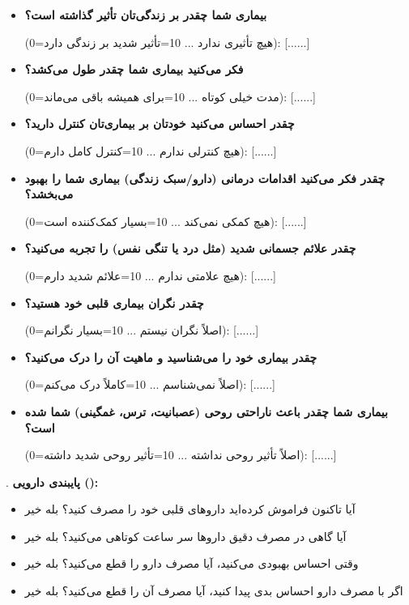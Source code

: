 \begin{itemize}
  \item \textbf{بیماری شما چقدر بر زندگی‌تان تأثیر گذاشته است؟}

  (0=هیچ تأثیری ندارد ... 10=تأثیر شدید بر زندگی دارد): [......]

  \item \textbf{فکر می‌کنید بیماری شما چقدر طول می‌کشد؟}

  (0=مدت خیلی کوتاه ... 10=برای همیشه باقی می‌ماند): [......]

  \item \textbf{چقدر احساس می‌کنید خودتان بر بیماری‌تان کنترل دارید؟}

  (0=هیچ کنترلی ندارم ... 10=کنترل کامل دارم): [......]

  \item \textbf{چقدر فکر می‌کنید اقدامات درمانی (دارو/سبک زندگی) بیماری شما را بهبود می‌بخشد؟}

  (0=هیچ کمکی نمی‌کند ... 10=بسیار کمک‌کننده است): [......]

  \item \textbf{چقدر علائم جسمانی شدید (مثل درد یا تنگی نفس) را تجربه می‌کنید؟}

  (0=هیچ علامتی ندارم ... 10=علائم شدید دارم): [......]

  \item \textbf{چقدر نگران بیماری قلبی خود هستید؟}

  (0=اصلاً نگران نیستم ... 10=بسیار نگرانم): [......]

  \item \textbf{چقدر بیماری خود را می‌شناسید و ماهیت آن را درک می‌کنید؟}

  (0=اصلاً نمی‌شناسم ... 10=کاملاً درک می‌کنم): [......]

  \item \textbf{بیماری شما چقدر باعث ناراحتی روحی (عصبانیت، ترس، غمگینی) شما شده است؟}

  (0=اصلاً تأثیر روحی نداشته ... 10=تأثیر روحی شدید داشته): [......]
\end{itemize}

. \textbf{پایبندی دارویی ():}
\begin{itemize}
  \item آیا تاکنون فراموش کرده‌اید داروهای قلبی خود را مصرف کنید؟ \checkbox{} بله \quad \checkbox{} خیر
  \item آیا گاهی در مصرف دقیق داروها سر ساعت کوتاهی می‌کنید؟ \checkbox{} بله \quad \checkbox{} خیر
  \item وقتی احساس بهبودی می‌کنید، آیا مصرف دارو را قطع می‌کنید؟ \checkbox{} بله \quad \checkbox{} خیر
  \item اگر با مصرف دارو احساس بدی پیدا کنید، آیا مصرف آن را قطع می‌کنید؟ \checkbox{} بله \quad \checkbox{} خیر
\end{itemize}

